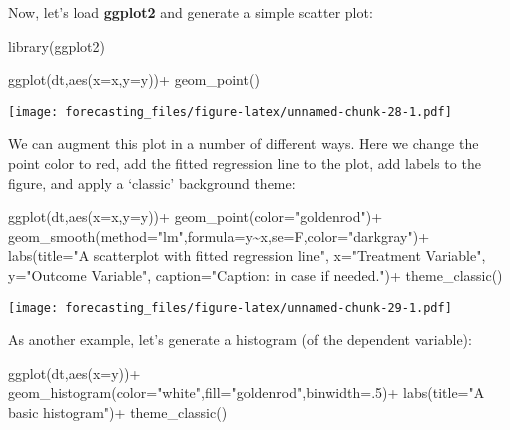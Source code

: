 \documentclass[
  oneside]{book}
\newenvironment{Shaded}{\begin{snugshade}}{\end{snugshade}}
\newcommand{\AttributeTok}[1]{\textcolor[rgb]{0.77,0.63,0.00}{#1}}
\newcommand{\DecValTok}[1]{\textcolor[rgb]{0.00,0.00,0.81}{#1}}
\newcommand{\FunctionTok}[1]{\textcolor[rgb]{0.00,0.00,0.00}{#1}}
\newcommand{\NormalTok}[1]{#1}
\newcommand{\SpecialCharTok}[1]{\textcolor[rgb]{0.00,0.00,0.00}{#1}}
\newcommand{\StringTok}[1]{\textcolor[rgb]{0.31,0.60,0.02}{#1}}
\begin{document}
Now, let's load \textbf{ggplot2} and generate a simple scatter plot:

\begin{Shaded}
\begin{Highlighting}[]
\FunctionTok{library}\NormalTok{(ggplot2)}

\FunctionTok{ggplot}\NormalTok{(dt,}\FunctionTok{aes}\NormalTok{(}\AttributeTok{x=}\NormalTok{x,}\AttributeTok{y=}\NormalTok{y))}\SpecialCharTok{+}
  \FunctionTok{geom\_point}\NormalTok{()}
\end{Highlighting}
\end{Shaded}

\texttt{[image: forecasting\_files/figure-latex/unnamed-chunk-28-1.pdf]}

We can augment this plot in a number of different ways. Here we change the point color to red, add the fitted regression line to the plot, add labels to the figure, and apply a `classic' background theme:

\begin{Shaded}
\begin{Highlighting}[]
\FunctionTok{ggplot}\NormalTok{(dt,}\FunctionTok{aes}\NormalTok{(}\AttributeTok{x=}\NormalTok{x,}\AttributeTok{y=}\NormalTok{y))}\SpecialCharTok{+}
  \FunctionTok{geom\_point}\NormalTok{(}\AttributeTok{color=}\StringTok{"goldenrod"}\NormalTok{)}\SpecialCharTok{+}
  \FunctionTok{geom\_smooth}\NormalTok{(}\AttributeTok{method=}\StringTok{"lm"}\NormalTok{,}\AttributeTok{formula=}\NormalTok{y}\SpecialCharTok{\textasciitilde{}}\NormalTok{x,}\AttributeTok{se=}\NormalTok{F,}\AttributeTok{color=}\StringTok{"darkgray"}\NormalTok{)}\SpecialCharTok{+}
  \FunctionTok{labs}\NormalTok{(}\AttributeTok{title=}\StringTok{"A scatterplot with fitted regression line"}\NormalTok{, }
       \AttributeTok{x=}\StringTok{"Treatment Variable"}\NormalTok{, }
       \AttributeTok{y=}\StringTok{"Outcome Variable"}\NormalTok{, }
       \AttributeTok{caption=}\StringTok{"Caption: in case if needed."}\NormalTok{)}\SpecialCharTok{+}
  \FunctionTok{theme\_classic}\NormalTok{()}
\end{Highlighting}
\end{Shaded}

\texttt{[image: forecasting\_files/figure-latex/unnamed-chunk-29-1.pdf]}

As another example, let's generate a histogram (of the dependent variable):

\begin{Shaded}
\begin{Highlighting}[]
\FunctionTok{ggplot}\NormalTok{(dt,}\FunctionTok{aes}\NormalTok{(}\AttributeTok{x=}\NormalTok{y))}\SpecialCharTok{+}
  \FunctionTok{geom\_histogram}\NormalTok{(}\AttributeTok{color=}\StringTok{"white"}\NormalTok{,}\AttributeTok{fill=}\StringTok{"goldenrod"}\NormalTok{,}\AttributeTok{binwidth=}\NormalTok{.}\DecValTok{5}\NormalTok{)}\SpecialCharTok{+}
  \FunctionTok{labs}\NormalTok{(}\AttributeTok{title=}\StringTok{"A basic histogram"}\NormalTok{)}\SpecialCharTok{+}
  \FunctionTok{theme\_classic}\NormalTok{()}
\end{Highlighting}
\end{Shaded}
\end{document}
